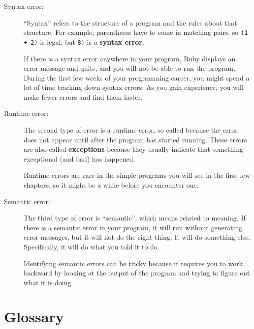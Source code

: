 \documentclass[10pt]{book}
\begin{document}
\begin{description}

\item[Syntax error:] ``Syntax'' refers to the structure of a program
  and the rules about that structure.  For example, parentheses have
  to come in matching pairs, so {\tt (1 + 2)} is legal, but {\tt 8)}
  is a {\bf syntax error}.   

If there is a syntax error
anywhere in your program, Ruby displays an error message and quits,
and you will not be able to run the program.  During the first few
weeks of your programming career, you might spend a lot of
time tracking down syntax errors.  As you gain experience, you will
make fewer errors and find them faster.


\item[Runtime error:] The second type of error is a runtime error, so
  called because the error does not appear until after the program has
  started running.  These errors are also called {\bf exceptions}
  because they usually indicate that something exceptional (and bad)
  has happened.   
    

Runtime errors are rare in the simple programs you will see in the
first few chapters, so it might be a while before you encounter one.


\item[Semantic error:] The third type of error is ``semantic'', which
  means related to meaning.  If there is a semantic error in your
  program, it will run without generating error messages, but it will
  not do the right thing.  It will do something else.  Specifically,
  it will do what you told it to do.  
   

Identifying semantic errors can be tricky because it requires you to work
backward by looking at the output of the program and trying to figure
out what it is doing.

\end{description}


\section{Glossary}
\end{document}
